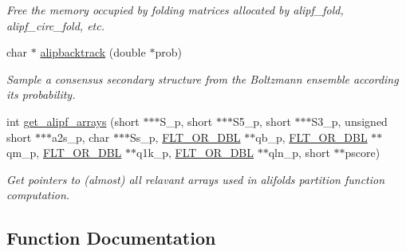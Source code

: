 \begin{DoxyCompactItemize}
\begin{DoxyCompactList}\small\item\em Free the memory occupied by folding matrices allocated by alipf\+\_\+fold, alipf\+\_\+circ\+\_\+fold, etc. \end{DoxyCompactList}\item 
char $\ast$ \hyperlink{group__part__func__global__deprecated_ga0df40248788f0fb17ebdc59d74116d1c}{alipbacktrack} (double $\ast$prob)
\begin{DoxyCompactList}\small\item\em Sample a consensus secondary structure from the Boltzmann ensemble according its probability. \end{DoxyCompactList}\item 
int \hyperlink{group__part__func__global__deprecated_ga5349960075b1847720a2e9df021e2675}{get\+\_\+alipf\+\_\+arrays} (short $\ast$$\ast$$\ast$S\+\_\+p, short $\ast$$\ast$$\ast$S5\+\_\+p, short $\ast$$\ast$$\ast$S3\+\_\+p, unsigned short $\ast$$\ast$$\ast$a2s\+\_\+p, char $\ast$$\ast$$\ast$Ss\+\_\+p, \hyperlink{group__data__structures_ga31125aeace516926bf7f251f759b6126}{F\+L\+T\+\_\+\+O\+R\+\_\+\+D\+BL} $\ast$$\ast$qb\+\_\+p, \hyperlink{group__data__structures_ga31125aeace516926bf7f251f759b6126}{F\+L\+T\+\_\+\+O\+R\+\_\+\+D\+BL} $\ast$$\ast$qm\+\_\+p, \hyperlink{group__data__structures_ga31125aeace516926bf7f251f759b6126}{F\+L\+T\+\_\+\+O\+R\+\_\+\+D\+BL} $\ast$$\ast$q1k\+\_\+p, \hyperlink{group__data__structures_ga31125aeace516926bf7f251f759b6126}{F\+L\+T\+\_\+\+O\+R\+\_\+\+D\+BL} $\ast$$\ast$qln\+\_\+p, short $\ast$$\ast$pscore)
\begin{DoxyCompactList}\small\item\em Get pointers to (almost) all relavant arrays used in alifold\textquotesingle{}s partition function computation. \end{DoxyCompactList}\end{DoxyCompactItemize}


\subsection{Function Documentation}
\mbox{\label{group__part__func__global__deprecated_gab46954fb0ed3b6d5631e7f9b802978cd}} 
